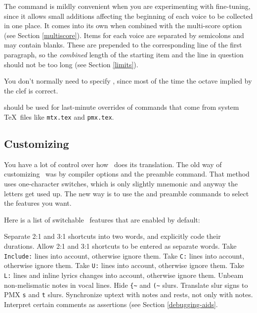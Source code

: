 \documentclass[11pt]{article}
\begin{document}
The  command is mildly convenient when you are experimenting with 
fine-tuning, since it allows small additions affecting the beginning of 
each voice to be collected in one place.  It comes into its own when
combined with the multi-score option (see Section  \ref{multiscore}).
  Items for each voice are separated by semicolons and may contain
blanks.  These are prepended to the corresponding line of the first
paragraph, so the \emph{combined} length of the starting item and the
line in question should not be too long (see Section \ref{limits}).

You don't normally need to specify  , 
since most of the time the octave implied by the clef is correct.

  should be used for last-minute overrides
of commands that come from system \TeX\ files like \verb`mtx.tex`
and \verb`pmx.tex`.

\subsection{Customizing \MTx}  \label{customize}

You have a lot of control over how \MTx\ does its translation.  The old way
of customizing \MTx\ was by compiler options and the 
preamble command.  That method uses one-character switches, which is
only slightly mnemonic and anyway the letters get used up.  
The new way is to use the  and  
preamble commands to select the features you want.  

	Here is a list of switchable \MTx\ features that are 
enabled by default:

\begin{description}
    Separate 2:1 and 3:1 shortcuts into two words, and
   explicitly code their durations.
    Allow 2:1 and 3:1 shortcuts to be entered as 
    separate words.
    Take \texttt{Include:} lines into account, otherwise
    ignore them.
   Take \texttt{C:} lines into account, otherwise ignore them.
   Take \texttt{U:} lines into account, otherwise ignore them.
   Take \texttt{L:} lines and inline lyrics changes into
    account, otherwise ignore them.
   Unbeam non-melismatic notes in vocal lines.
   Hide \verb"{~" and \verb"(~" slurs.
   Translate slur signs to PMX \texttt{s} and \texttt{t}
    slurs.
   Synchronize uptext with notes and rests, not only with
    notes.
   Interpret certain comments as assertions (see Section 
   \ref{debugging-aids}.
\end{description}
\end{document}
